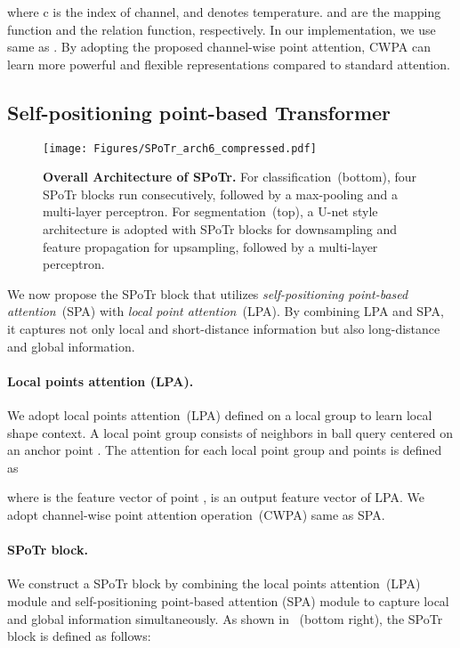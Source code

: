 \documentclass[10pt,twocolumn,letterpaper]{article}
\begin{document}
where c is the index of channel, and  denotes temperature.
 and  are the mapping function and the relation function, respectively.
In our implementation, we use  same as .
By adopting the proposed channel-wise point attention, CWPA can learn more powerful and flexible representations compared to standard attention.


     \subsection{Self-positioning point-based Transformer}
    \label{sec:3.3}

\begin{figure*}[ht] 
\centering
\texttt{[image: Figures/SPoTr\_arch6\_compressed.pdf]}
\caption{
\textbf{Overall Architecture of SPoTr.} For classification~(bottom), four SPoTr blocks run consecutively, followed by a max-pooling and a multi-layer perceptron. 
For segmentation~(top), a U-net style architecture is adopted with SPoTr blocks for downsampling and feature propagation for upsampling, followed by a multi-layer perceptron.}
\label{fig:fig4}
\end{figure*}
 
We now propose the SPoTr block that utilizes \emph{self-positioning point-based attention}~(SPA) with \emph{local point attention}~(LPA).
By combining LPA and SPA, it captures not only local and short-distance information but also long-distance and global information.


\paragraph{Local points attention (LPA).} 
We adopt local points attention~(LPA) defined on a local group to learn local shape context.
A local point group consists of neighbors in ball query centered on an anchor point .
The attention for each local point group  and points  is defined as

where  is the feature vector of point ,  is an output feature vector of LPA.
We adopt channel-wise point attention operation~(CWPA) same as SPA.














\paragraph{SPoTr block.}
We construct a SPoTr block by combining the local points attention~(LPA) module and self-positioning point-based attention (SPA) module to capture local and global information simultaneously.
As shown in ~(bottom right), the SPoTr block is defined as follows:
\end{document}
